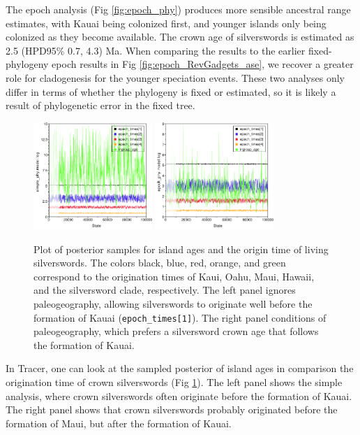 The epoch analysis (Fig \ref{fig:epoch_phy}) produces more sensible ancestral range estimates, with Kauai being colonized first, and younger islands only being colonized as they become available.
The crown age of silverswords is estimated as 2.5 (HPD95\% 0.7, 4.3) Ma.
When comparing the results to the earlier fixed-phylogeny epoch results in Fig \ref{fig:epoch_RevGadgets_ase}, we recover a greater role for cladogenesis for the younger speciation events.
These two analyses only differ in terms of whether the phylogeny is fixed or estimated, so it is likely a result of phylogenetic error in the fixed tree.


\begin{figure}[!h]
\centering
\includegraphics[width=0.4\textwidth]{figures/fig_simple_ages.pdf} \includegraphics[width=0.4\textwidth]{figures/fig_epoch_ages.pdf} 

\caption{Plot of posterior samples for island ages and the origin time of living silverswords.
The colors black, blue, red, orange, and green correspond to the origination times of Kaui, Oahu, Maui, Hawaii, and the silversword clade, respectively.
The left panel ignores paleogeography, allowing silverswords to originate well before the formation of Kauai ({\tt epoch\_times[1]}).
The right panel conditions of paleogeography, which prefers a silversword crown age that follows the formation of Kauai.}
\label{fig:epoch_ages}
\end{figure}


In Tracer, one can look at the sampled posterior of island ages in comparison the origination time of crown silverswords (Fig \ref{fig:epoch_ages}).
The left panel shows the simple analysis, where crown silverswords often originate before the formation of Kauai.
The right panel shows that crown silverswords probably originated before the formation of Maui, but after the formation of Kauai.

